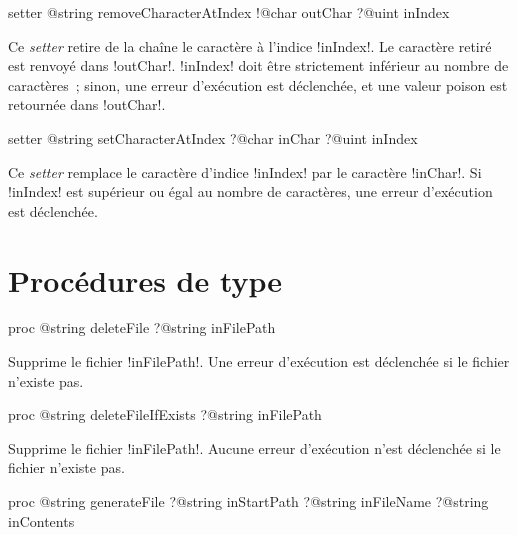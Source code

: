 \begin{galgas3box}
setter @string removeCharacterAtIndex
   !@char outChar
   ?@uint inIndex
\end{galgas3box}


Ce \emph{setter} retire de la chaîne le caractère à l'indice \ggst!inIndex!. Le caractère retiré est renvoyé dans \ggst!outChar!. \ggst!inIndex! doit être strictement inférieur au nombre de caractères~; sinon, une erreur d'exécution est déclenchée, et une valeur poison est retournée dans \ggst!outChar!.







\begin{galgas3box}
setter @string setCharacterAtIndex
   ?@char inChar
   ?@uint inIndex
\end{galgas3box}


Ce \emph{setter} remplace le caractère d'indice \ggst!inIndex! par le caractère \ggst!inChar!. Si \ggst!inIndex! est supérieur ou égal au nombre de caractères, une erreur d'exécution est déclenchée.




\section{Procédures de type}




\begin{galgas3box}
proc @string deleteFile ?@string inFilePath
\end{galgas3box}

Supprime le fichier \ggst!inFilePath!. Une erreur d'exécution est déclenchée si le fichier n'existe pas.






\begin{galgas3box}
proc @string deleteFileIfExists ?@string inFilePath
\end{galgas3box}

Supprime le fichier \ggst!inFilePath!. Aucune erreur d'exécution n'est déclenchée si le fichier n'existe pas.








\begin{galgas3box}
proc @string generateFile
   ?@string inStartPath
   ?@string inFileName
   ?@string inContents
\end{galgas3box}

